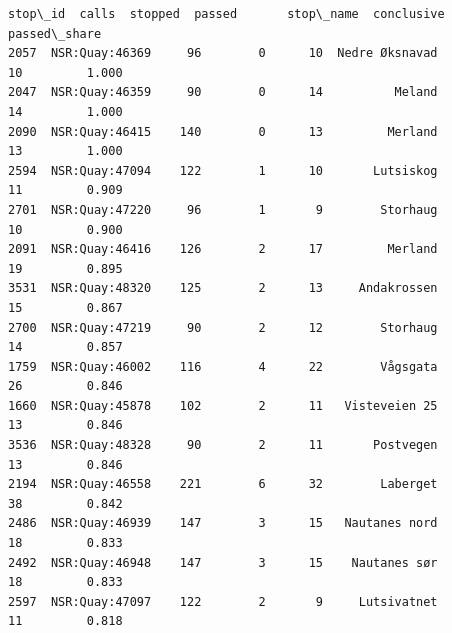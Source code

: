 \documentclass[11pt]{article}
\begin{document}
    
    \begin{Verbatim}[commandchars=\\\{\}]
             stop\_id  calls  stopped  passed       stop\_name  conclusive  passed\_share
2057  NSR:Quay:46369     96        0      10  Nedre Øksnavad          10         1.000
2047  NSR:Quay:46359     90        0      14          Meland          14         1.000
2090  NSR:Quay:46415    140        0      13         Merland          13         1.000
2594  NSR:Quay:47094    122        1      10       Lutsiskog          11         0.909
2701  NSR:Quay:47220     96        1       9        Storhaug          10         0.900
2091  NSR:Quay:46416    126        2      17         Merland          19         0.895
3531  NSR:Quay:48320    125        2      13     Andakrossen          15         0.867
2700  NSR:Quay:47219     90        2      12        Storhaug          14         0.857
1759  NSR:Quay:46002    116        4      22        Vågsgata          26         0.846
1660  NSR:Quay:45878    102        2      11   Visteveien 25          13         0.846
3536  NSR:Quay:48328     90        2      11       Postvegen          13         0.846
2194  NSR:Quay:46558    221        6      32        Laberget          38         0.842
2486  NSR:Quay:46939    147        3      15   Nautanes nord          18         0.833
2492  NSR:Quay:46948    147        3      15    Nautanes sør          18         0.833
2597  NSR:Quay:47097    122        2       9     Lutsivatnet          11         0.818
    \end{Verbatim}

    
    
\end{document}
